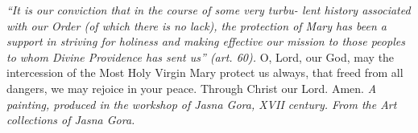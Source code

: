 \pagestyle{empty}
\hspace{0pt}
\vfill

\textit{``It is our conviction that in the course of some very turbu-
lent history associated with our Order (of which there is no lack),
the protection of Mary has been a support in striving for holiness
and making effective our mission to those peoples to whom Divine
Providence has sent us'' (art. 60).}
\medbreak
O, Lord, our God, may the intercession of the Most Holy
Virgin Mary protect us always, that freed from all dangers, we may
rejoice in your peace. Through Christ our Lord. Amen.
\vfill
\textit{A painting,
produced in the workshop of Jasna Gora, XVII century. From the
Art collections of Jasna Gora.}
\hspace{0pt}
\newpage
